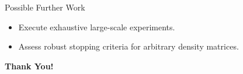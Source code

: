 \documentclass[aspectratio=169]{beamer}
\begin{document}
\begin{frame}{Possible Further Work}
  \begin{itemize}
    \item Execute exhaustive large-scale experiments.
    \item Assess robust stopping criteria for arbitrary density matrices.
  \end{itemize}
  \vspace{1.5cm}
  \begin{center}
    \Large \textbf{Thank You!}
  \end{center}
\end{frame}
\end{document}
